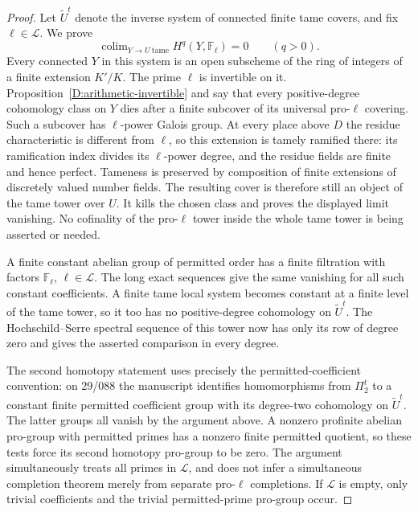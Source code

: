 \begin{proof}
Let $\widetilde U^t$ denote the inverse system of connected finite
tame covers, and fix $\ell\in\mathcal L$. We prove
\[
 \mathop{\operatorname{colim}}_{Y\to U\ \mathrm{tame}}
           H^q(Y,\mathbb F_\ell)=0\qquad(q>0).
\]
Every connected $Y$ in this system is an open subscheme of the ring
of integers of a finite extension $K'/K$. The prime $\ell$ is
invertible on it. Proposition~\ref{D:arithmetic-invertible} and
\cite[Proposition 2.1(iii)]{Schmidt2007} say that every positive-degree
cohomology class on $Y$ dies after a finite subcover of its universal
pro-$\ell$ covering. Such a subcover has $\ell$-power Galois group.
At every place above $D$ the residue characteristic is different
from $\ell$, so this extension is tamely ramified there: its
ramification index divides its $\ell$-power degree, and the residue
fields are finite and hence perfect. Tameness is preserved by
composition of finite extensions of discretely valued number fields.
The resulting cover is therefore still an object of the tame tower
over $U$. It kills the chosen class and proves the displayed limit
vanishing. No cofinality of the pro-$\ell$ tower inside the whole
tame tower is being asserted or needed.

A finite constant abelian group of permitted order has a finite
filtration with factors $\mathbb F_\ell$, $\ell\in\mathcal L$.
The long exact sequences give the same vanishing for all such
constant coefficients. A finite tame local system becomes constant
at a finite level of the tame tower, so it too has no positive-degree
cohomology on $\widetilde U^t$. The Hochschild--Serre spectral
sequence of this tower now has only its row of degree zero and gives
the asserted comparison in every degree.

The second homotopy statement uses precisely the permitted-coefficient
convention: on 29/088 the manuscript identifies homomorphisms from
$\Pi_2^t$ to a constant finite permitted coefficient group with its
degree-two cohomology on $\widetilde U^t$. The latter groups all
vanish by the argument above. A nonzero profinite abelian pro-group
with permitted primes has a nonzero finite permitted quotient,
so these tests force its second homotopy pro-group to be zero.
The argument simultaneously treats all primes in $\mathcal L$,
and does not infer a simultaneous completion theorem merely from
separate pro-$\ell$ completions. If $\mathcal L$ is empty, only
trivial coefficients and the trivial permitted-prime pro-group occur.
\end{proof}

